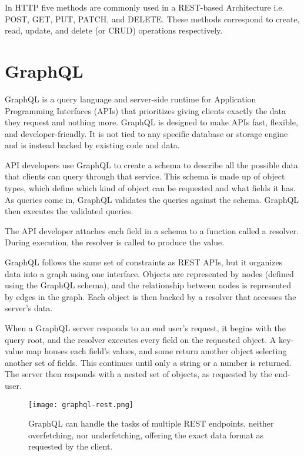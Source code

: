 In HTTP five methods are commonly used in a REST-based Architecture i.e. POST, GET, PUT, PATCH, and DELETE. These methods correspond to create, read, 
update, and delete (or CRUD) operations respectively.~\cite{GeeksRestAPI}

\section{GraphQL}

GraphQL is a query language and server-side runtime for Application Programming Interfaces (APIs) 
that prioritizes giving clients exactly the data they request and nothing more. 
GraphQL is designed to make APIs fast, flexible, and developer-friendly. It is not tied 
to any specific database or storage engine and is instead backed by existing code and data.

API developers use GraphQL to create a schema to describe all the possible data that clients can query through that service. This schema is made up of object types, which define which kind of object can be
requested and what fields it has. As queries come in, GraphQL validates the queries against the schema. 
GraphQL then executes the validated queries.

The API developer attaches each field in a schema to a function called a resolver. 
During execution, the resolver is called to produce the value.~\cite{WhatisGraphQL}

GraphQL follows the same set of constraints as REST APIs, but it organizes data into a 
graph using one interface. Objects are represented by nodes (defined using the GraphQL schema), 
and the relationship between nodes is represented by edges in the graph. Each object is then backed by a resolver that accesses the server’s data.

When a GraphQL server responds to an end user’s request, it begins with the query root,
and the resolver executes every field on the requested object. A key-value map houses each field’s
values, and some return another object selecting another set of fields. This continues until only a 
string or a number is returned. The server then responds with a nested set of objects, as requested by the end-user.~\cite{RubrikGraphQL}

\begin{figure}
    \begin{center}
        \texttt{[image: graphql-rest.png]}
    \end{center}
    \caption{GraphQL can handle the tasks of multiple REST endpoints, 
    neither overfetching, nor underfetching,
    offering the exact data format as requested by the client.}
    \label{fig:graphql}
\end{figure}
  

